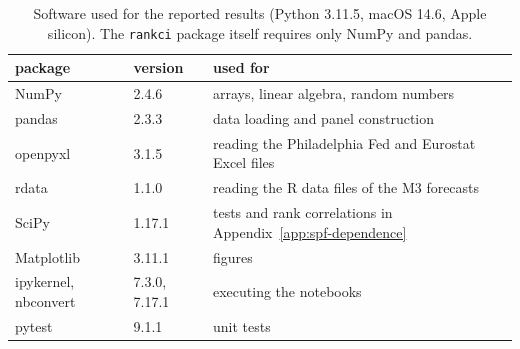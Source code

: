 \begin{table}[htb]
  \centering
  \caption[Software environment]{Software used for the reported results (Python
  3.11.5, macOS 14.6, Apple silicon). The \texttt{rankci} package itself requires
  only NumPy and pandas.}
  \label{tab:impl-env}
  \small
  \begin{tabular}{llp{7.6cm}}
    \toprule
    package & version & used for\\
    \midrule
    NumPy      & 2.4.6  & arrays, linear algebra, random numbers\\
    pandas     & 2.3.3  & data loading and panel construction\\
    openpyxl   & 3.1.5  & reading the Philadelphia Fed and Eurostat Excel files\\
    rdata      & 1.1.0  & reading the R data files of the M3 forecasts\\
    SciPy      & 1.17.1 & tests and rank correlations in
                          Appendix~\ref{app:spf-dependence}\\
    Matplotlib & 3.11.1 & figures\\
    ipykernel, nbconvert & 7.3.0, 7.17.1 & executing the notebooks\\
    pytest     & 9.1.1  & unit tests\\
    \bottomrule
  \end{tabular}
\end{table}
